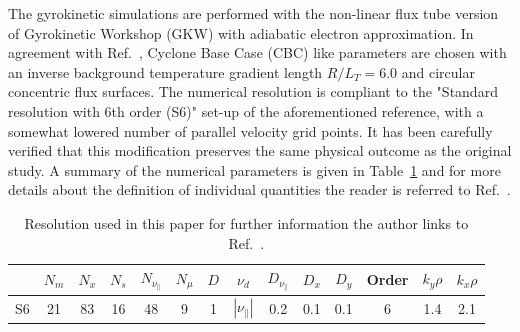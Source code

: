 \documentclass[aip, amsmath, amssymb, reprint, twocolumn, floatfix]{revtex4-1}
\newcommand{\rlt}{R/L_T}
\begin{document}
The gyrokinetic simulations are performed with the non-linear flux tube version of Gyrokinetic Workshop (GKW) \cite{Peeters2009} with adiabatic electron approximation.
In agreement with Ref.~, Cyclone Base Case (CBC) like parameters are chosen with an inverse background temperature gradient length $\rlt = 6.0$ and circular concentric flux surfaces. 
The numerical resolution is compliant to the "Standard resolution with 6th order (S6)" set-up of the aforementioned reference, with a somewhat lowered number of parallel velocity grid points.
It has been carefully verified that this modification preserves the same physical outcome as the original study.
A summary of the numerical parameters is given in Table~\ref{tab:resolution} and for more details about the definition of individual quantities the reader is referred to Ref.~.
\begin{table}[ht]
	\begin{ruledtabular}
		\begin{tabular}{l | ccccc | ccccc | c | cc}
			& $N_m$ & $N_x$ & $N_s$ & $N_{\nu_\parallel}$ & $N_\mu$ & $D$ & $\nu_d$           & $D_{\nu_\parallel}$ & $D_x$ & $D_y$ & Order & $k_y\rho$ & $k_x\rho$ \\
			\hline
			S6   & 21    & 83    & 16    & 48                  & 9       & 1   & $|\nu_\parallel|$ & 0.2                 & 0.1   & 0.1   & 6     & 1.4       & 2.1       \\
		\end{tabular}
	\end{ruledtabular}
	\caption{
		Resolution used in this paper for further information the author links to Ref.~.}
	\label{tab:resolution}
\end{table}

\end{document}
